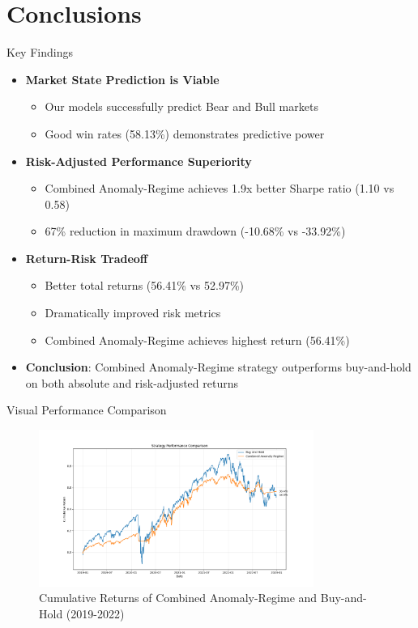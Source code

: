 \documentclass[aspectratio=169,xcolor=dvipsnames]{beamer}
\begin{document}
\section{Conclusions}
\begin{frame}{Key Findings}
	\begin{itemize}
		\item \textbf{Market State Prediction is Viable}
		      \begin{itemize}
			      \item Our models successfully predict Bear and Bull markets
			      \item Good win rates (58.13\%) demonstrates predictive power
		      \end{itemize}
		\item \textbf{Risk-Adjusted Performance Superiority}
		      \begin{itemize}
			      \item Combined Anomaly-Regime achieves 1.9x better Sharpe ratio (1.10 vs 0.58)
			      \item 67\% reduction in maximum drawdown (-10.68\% vs -33.92\%)
		      \end{itemize}
		\item \textbf{Return-Risk Tradeoff}
		      \begin{itemize}
			      \item Better total returns (56.41\% vs 52.97\%)
			      \item Dramatically improved risk metrics
			      \item Combined Anomaly-Regime achieves highest return (56.41\%)
		      \end{itemize}
		\item \textbf{Conclusion}: Combined Anomaly-Regime strategy outperforms buy-and-hold on both absolute and risk-adjusted returns
	\end{itemize}
\end{frame}

\begin{frame}{Visual Performance Comparison}
	\begin{figure}
		\centering
		\includegraphics[width=0.8\textwidth]{strategy_performance_simple.png}
		\caption{Cumulative Returns of Combined Anomaly-Regime and Buy-and-Hold (2019-2022)}
	\end{figure}
\end{frame}
\end{document}
